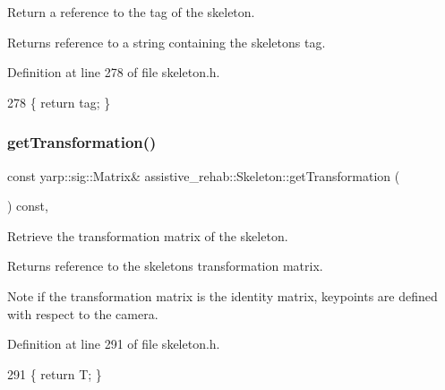 Return a reference to the tag of the skeleton. 

\begin{DoxyReturn}{Returns}
reference to a string containing the skeleton\textquotesingle{}s tag. 
\end{DoxyReturn}


Definition at line 278 of file skeleton.\+h.


\begin{DoxyCode}
278 \{ \textcolor{keywordflow}{return} tag; \}
\end{DoxyCode}
\mbox{\label{classassistive__rehab_1_1Skeleton_a2bdcc0d686a5a232aa2c07528cf2e647}} 
\subsubsection{\texorpdfstring{get\+Transformation()}{getTransformation()}}
{\footnotesize\ttfamily const yarp\+::sig\+::\+Matrix\& assistive\+\_\+rehab\+::\+Skeleton\+::get\+Transformation (\begin{DoxyParamCaption}{ }\end{DoxyParamCaption}) const\hspace{0.3cm}{\ttfamily [inline]}, {\ttfamily [inherited]}}



Retrieve the transformation matrix of the skeleton. 

\begin{DoxyReturn}{Returns}
reference to the skeleton\textquotesingle{}s transformation matrix. 
\end{DoxyReturn}
\begin{DoxyNote}{Note}
if the transformation matrix is the identity matrix, keypoints are defined with respect to the camera. 
\end{DoxyNote}


Definition at line 291 of file skeleton.\+h.


\begin{DoxyCode}
291 \{ \textcolor{keywordflow}{return} T; \}
\end{DoxyCode}
\mbox{\label{classassistive__rehab_1_1Skeleton_a35c3cdea575eb474a2cb8e0186011cff}} 
